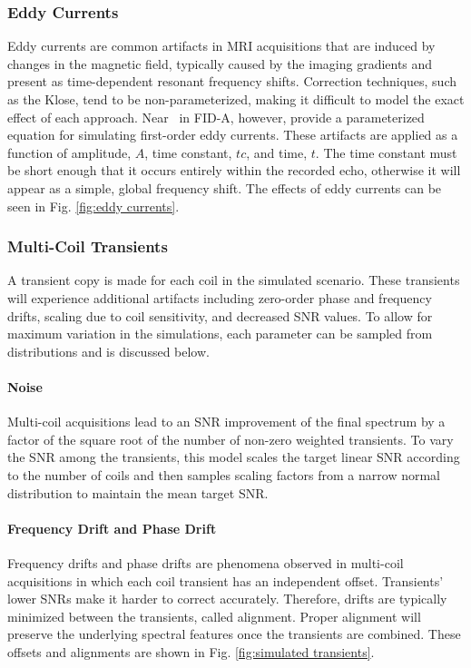 \subsubsection{Eddy Currents}
Eddy currents are common artifacts in MRI acquisitions that are induced by changes in the magnetic field, typically caused by the imaging gradients and present as time-dependent resonant frequency shifts. Correction techniques, such as the Klose\cite{Klose1990}, tend to be non-parameterized, making it difficult to model the exact effect of each approach. Near \etal\ in FID-A\cite{Simpson2017}, however, provide a parameterized equation for simulating first-order eddy currents. These artifacts are applied as a function of amplitude, $A$, time constant, $tc$, and time, $t$. The time constant must be short enough that it occurs entirely within the recorded echo, otherwise it will appear as a simple, global frequency shift. The effects of eddy currents can be seen in Fig. \ref{fig:eddy currents}.



\subsubsection{Multi-Coil Transients}
A transient copy is made for each coil in the simulated scenario. These transients will experience additional artifacts including zero-order phase and frequency drifts, scaling due to coil sensitivity, and decreased SNR values. To allow for maximum variation in the simulations, each parameter can be sampled from distributions and is discussed below.

\paragraph{Noise} Multi-coil acquisitions lead to an SNR improvement of the final spectrum by a factor of the square root of the number of non-zero weighted transients. To vary the SNR among the transients, this model scales the target linear SNR according to the number of coils and then samples scaling factors from a narrow normal distribution to maintain the mean target SNR. 

\paragraph{Frequency Drift and Phase Drift}
Frequency drifts and phase drifts are phenomena observed in multi-coil acquisitions in which each coil transient has an independent offset. Transients’ lower SNRs make it harder to correct accurately. Therefore, drifts are typically minimized between the transients, called alignment. Proper alignment will preserve the underlying spectral features once the transients are combined. These offsets and alignments are shown in Fig. \ref{fig:simulated transients}.

